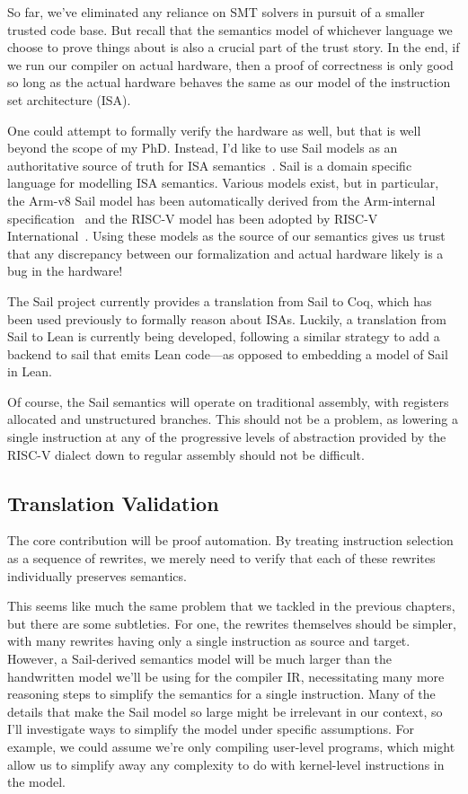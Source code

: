 \documentclass[a4paper]{scrartcl}
\begin{document}
So far, we've eliminated any reliance on SMT solvers in pursuit of a
smaller trusted code base. But recall that the semantics model of
whichever language we choose to prove things about is also a crucial
part of the trust story. In the end, if we run our compiler on actual
hardware, then a proof of correctness is only good so long as the actual
hardware behaves the same as our model of the instruction set
architecture (ISA).

One could attempt to formally verify the hardware as well, but that is
well beyond the scope of my PhD. Instead, I'd like to use Sail models as
an authoritative source of truth for ISA semantics~\cite{armstrongISASemanticsARMv8a2019}.
Sail is a domain specific
language for modelling ISA semantics. Various models exist, but in
particular, the Arm-v8 Sail model has been automatically derived from the Arm-internal 
specification~\cite{reidTrustworthySpecificationsARM} and the RISC-V model has
been adopted by RISC-V International~\cite{sammlerIslarisVerificationMachine2022}. 
Using these models as the source of our semantics gives us trust that any discrepancy
between our formalization and actual hardware likely is a bug in the
hardware!

The Sail project currently provides a translation from Sail to Coq,
which has been used previously to formally reason about ISAs. Luckily, a
translation from Sail to Lean is currently being developed, following a
similar strategy to add a backend to sail that emits Lean code---as
opposed to embedding a model of Sail in Lean.

Of course, the Sail semantics will operate on traditional assembly, with
registers allocated and unstructured branches. This should not be a
problem, as lowering a single instruction at any of the progressive
levels of abstraction provided by the RISC-V dialect down to regular 
assembly should not be difficult.

\subsection{Translation Validation}\label{translation-validation}

The core contribution will be proof automation. By treating
instruction selection as a sequence of rewrites, we merely need to
verify that each of these rewrites individually preserves semantics.

This seems like much the same problem that we tackled in the previous
chapters, but there are some subtleties. For one, the rewrites
themselves should be simpler, with many rewrites having only a single
instruction as source and target. However, a Sail-derived semantics
model will be much larger than the handwritten model we'll be using for
the compiler IR, necessitating many more reasoning steps to simplify the
semantics for a single instruction. Many of the details that make the
Sail model so large might be irrelevant in our context, so I'll
investigate ways to simplify the model under specific assumptions. For
example, we could assume we're only compiling user-level programs, which might
allow us to simplify away any complexity to do with kernel-level
instructions in the model.
\end{document}

